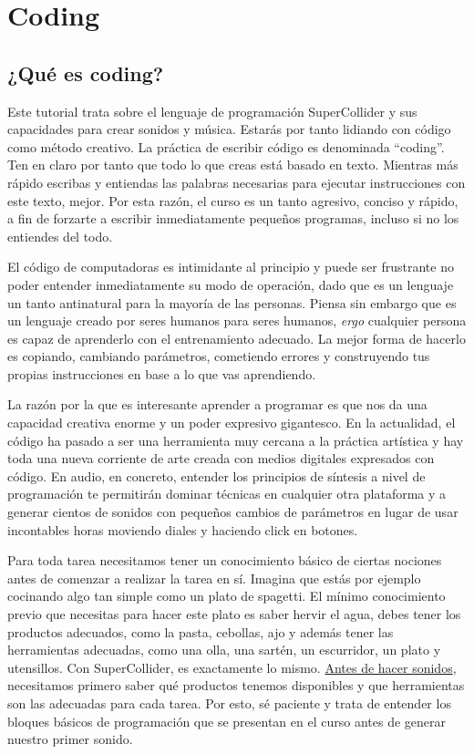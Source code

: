 \chapter{Coding}

\section{¿Qué es coding?}

Este tutorial trata sobre el lenguaje de programación SuperCollider y sus capacidades para crear sonidos y música. Estarás por tanto lidiando con código como método creativo. La práctica de escribir código es denominada ``coding''. Ten en claro por tanto que todo lo que creas está basado en texto. Mientras más rápido escribas y entiendas las palabras necesarias para ejecutar instrucciones con este texto, mejor. Por esta razón, el curso es un tanto agresivo, conciso y rápido, a fin de forzarte a escribir inmediatamente pequeños programas, incluso si no los entiendes del todo. 

El código de computadoras es intimidante al principio y puede ser frustrante no poder entender inmediatamente su modo de operación, dado que es un lenguaje un tanto antinatural para la mayoría de las personas. Piensa sin embargo que es un lenguaje creado por seres humanos para seres humanos, \textit{ergo} cualquier persona es capaz de aprenderlo con el entrenamiento adecuado. La mejor forma de hacerlo es copiando, cambiando parámetros, cometiendo errores y construyendo tus propias instrucciones en base a lo que vas aprendiendo. 

La razón por la que es interesante aprender a programar es que nos da una capacidad creativa enorme y un poder expresivo gigantesco. En la actualidad, el código ha pasado a ser una herramienta muy cercana a la práctica artística y hay toda una nueva corriente de arte creada con medios digitales expresados con código. En audio, en concreto, entender los principios de síntesis a nivel de programación te permitirán dominar técnicas en cualquier otra plataforma y a generar cientos de sonidos con pequeños cambios de parámetros en lugar de usar incontables horas moviendo diales y haciendo click en botones.

Para toda tarea necesitamos tener un conocimiento básico de ciertas nociones antes de comenzar a realizar la tarea en sí. Imagina que estás por ejemplo cocinando algo tan simple como un plato de spagetti. El mínimo conocimiento previo que necesitas para hacer este plato es saber hervir el agua, debes tener los productos adecuados, como la pasta, cebollas, ajo y además tener las herramientas adecuadas, como una olla, una sartén, un escurridor, un plato y utensillos. Con SuperCollider, es exactamente lo mismo. \underline{Antes de hacer sonidos}, necesitamos primero saber qué productos tenemos disponibles y que herramientas son las adecuadas para cada tarea. Por esto, sé paciente y trata de entender los bloques básicos de programación que se presentan en el curso antes de generar nuestro primer sonido. 

